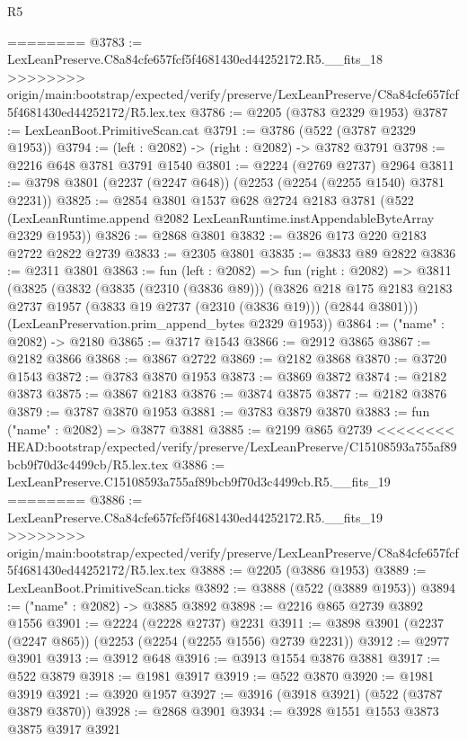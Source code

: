 \begin{lexlean}{R5}
\begin{coremodule}
{{{{{{{{{{{{{{{{{{{{{{{{{{{{{{{{{{{{{{{{{{{{{{{{{{{{{{{{{{{{{{========
@3783 := LexLeanPreserve.C8a84cfe657fcf5f4681430ed44252172.R5.__fits_18
>>>>>>>> origin/main:bootstrap/expected/verify/preserve/LexLeanPreserve/C8a84cfe657fcf5f4681430ed44252172/R5.lex.tex
@3786 := @2205 (@3783 @2329 @1953)
@3787 := LexLeanBoot.PrimitiveScan.cat
@3791 := @3786 (@522 (@3787 @2329 @1953))
@3794 := (left : @2082) -> (right : @2082) -> @3782 @3791
@3798 := @2216 @648 @3781 @3791 @1540
@3801 := @2224 (@2769 @2737) @2964
@3811 := @3798 @3801 (@2237 (@2247 @648)) (@2253 (@2254 (@2255 @1540) @3781 @2231))
@3825 := @2854
    @3801
    @1537
    @628
    @2724
    @2183
    @3781
    (@522 (LexLeanRuntime.append @2082 LexLeanRuntime.instAppendableByteArray @2329 @1953))
@3826 := @2868 @3801
@3832 := @3826 @173 @220 @2183 @2722 @2822 @2739
@3833 := @2305 @3801
@3835 := @3833 @89 @2822
@3836 := @2311 @3801
@3863 := fun (left : @2082) =>
  fun (right : @2082) =>
  @3811
    (@3825
      (@3832
        (@3835 (@2310 (@3836 @89)))
        (@3826
          @218
          @175
          @2183
          @2183
          @2737
          @1957
          (@3833 @19 @2737 (@2310 (@3836 @19)))
          (@2844 @3801)))
      (LexLeanPreservation.prim_append_bytes @2329 @1953))
@3864 := ("name" : @2082) -> @2180
@3865 := @3717 @1543
@3866 := @2912 @3865
@3867 := @2182 @3866
@3868 := @3867 @2722
@3869 := @2182 @3868
@3870 := @3720 @1543
@3872 := @3783 @3870 @1953
@3873 := @3869 @3872
@3874 := @2182 @3873
@3875 := @3867 @2183
@3876 := @3874 @3875
@3877 := @2182 @3876
@3879 := @3787 @3870 @1953
@3881 := @3783 @3879 @3870
@3883 := fun ("name" : @2082) => @3877 @3881
@3885 := @2199 @865 @2739
<<<<<<<< HEAD:bootstrap/expected/verify/preserve/LexLeanPreserve/C15108593a755af89bcb9f70d3c4499cb/R5.lex.tex
@3886 := LexLeanPreserve.C15108593a755af89bcb9f70d3c4499cb.R5.__fits_19
========
@3886 := LexLeanPreserve.C8a84cfe657fcf5f4681430ed44252172.R5.__fits_19
>>>>>>>> origin/main:bootstrap/expected/verify/preserve/LexLeanPreserve/C8a84cfe657fcf5f4681430ed44252172/R5.lex.tex
@3888 := @2205 (@3886 @1953)
@3889 := LexLeanBoot.PrimitiveScan.ticks
@3892 := @3888 (@522 (@3889 @1953))
@3894 := ("name" : @2082) -> @3885 @3892
@3898 := @2216 @865 @2739 @3892 @1556
@3901 := @2224 (@2228 @2737) @2231
@3911 := @3898 @3901 (@2237 (@2247 @865)) (@2253 (@2254 (@2255 @1556) @2739 @2231))
@3912 := @2977 @3901
@3913 := @3912 @648
@3916 := @3913 @1554 @3876 @3881
@3917 := @522 @3879
@3918 := @1981 @3917
@3919 := @522 @3870
@3920 := @1981 @3919
@3921 := @3920 @1957
@3927 := @3916 (@3918 @3921) (@522 (@3787 @3879 @3870))
@3928 := @2868 @3901
@3934 := @3928 @1551 @1553 @3873 @3875 @3917 @3921
}}}}}}}}}}}}}}}}}}}}}}}}}}}}}}}}}}}}}}}}}}}}}}}}}}}}}}}}}}}}}}
\end{coremodule}
\end{lexlean}
